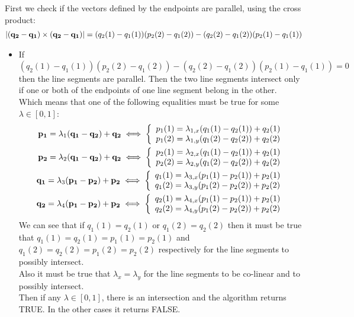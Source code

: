 \documentclass[11pt]{article}
\begin{document}
\begin{enumerate}
		First we check if the vectors defined by the endpoints are parallel, using the cross product:
		\begin{align*}
			|({\bf q_2}-{\bf q_1})\times({\bf q_2}-{\bf q_1})|=(q_2(1)-q_1(1))(p_2(2)-q_1(2))-(q_2(2)-q_1(2))(p_2(1)-q_1(1))
		\end{align*}
		\begin{itemize}
			\item If $(q_2(1)-q_1(1))(p_2(2)-q_1(2))-(q_2(2)-q_1(2))(p_2(1)-q_1(1))=0$ then the line segments are parallel. Then the two line segments intersect only if one or both of the endpoints of one line segment belong in the other.\\
			Which means that one of the following equalities must be true for some $\lambda\in [0,1]$:
			\begin{align*}
				{\bf p_1} = \lambda_1({\bf q_1}-{\bf q_2})+{\bf q_2}\iff \left\{\begin{array}{ll}
					p_1(1)=\lambda_{1,x}(q_1(1)-q_2(1))+q_2(1) \\ p_1(2)=\lambda_{1,y}(q_1(2)-q_2(2))+q_2(2)
				\end{array}\right.\\
				{\bf p_2} = \lambda_2({\bf q_1}-{\bf q_2})+{\bf q_2}\iff \left\{\begin{array}{ll}
					p_2(1)=\lambda_{2,x}(q_1(1)-q_2(1))+q_2(1) \\ p_2(2)=\lambda_{2,y}(q_1(2)-q_2(2))+q_2(2)
				\end{array}\right.\\
				{\bf q_1} = \lambda_3({\bf p_1}-{\bf p_2})+{\bf p_2}\iff \left\{\begin{array}{ll}
					q_1(1)=\lambda_{3,x}(p_1(1)-p_2(1))+p_2(1) \\ q_1(2)=\lambda_{3,y}(p_1(2)-p_2(2))+p_2(2)
				\end{array}\right.\\
				{\bf q_2} = \lambda_4({\bf p_1}-{\bf p_2})+{\bf p_2}\iff 	\left\{\begin{array}{ll}
					q_2(1)=\lambda_{4,x}(p_1(1)-p_2(1))+p_2(1) \\ 	q_2(2)=\lambda_{4,y}(p_1(2)-p_2(2))+p_2(2)
				\end{array}\right.
				\end{align*}
				We can see that if $q_1(1)=q_2(1)$ or $q_1(2)=q_2(2)$ then it must be true that $q_1(1)=q_2(1)=p_1(1)=p_2(1)$ and $q_1(2)=q_2(2)=p_1(2)=p_2(2)$ respectively for the line segments to possibly intersect.\\
				Also it must be true that $\lambda_x=\lambda_y$ for the line segments to be co-linear and to possibly intersect.\\
				Then if any $\lambda\in [0,1]$, there is an intersection and the algorithm returns TRUE. In the other cases it returns FALSE.
				

\end{itemize}
\end{enumerate}
\end{document}
